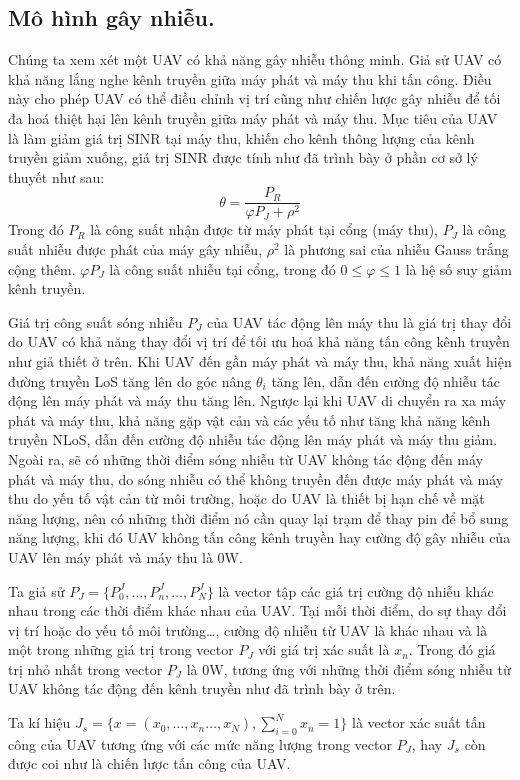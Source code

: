 \documentclass{uetgraduation}
\begin{document}
\subsection{Mô hình gây nhiễu.}
Chúng ta xem xét một UAV có khả năng gây nhiễu thông minh. Giả sử UAV có khả năng lắng nghe kênh truyền giữa máy phát và máy thu khi tấn công. Điều này cho phép UAV có thể điều chỉnh vị trí
cũng như chiến lược gây nhiễu để tối đa hoá thiệt hại lên kênh truyền giữa máy phát và máy thu. Mục tiêu của UAV là làm giảm giá trị SINR tại máy thu, khiến cho kênh thông lượng của kênh
truyền giảm xuống, giá trị SINR được tính như đã trình bày ở phần cơ sở lý thuyết như sau:
\[
\theta = \frac{P_R}{\varphi P_J + \rho^2}
\]
Trong đó $P_R$ là công suất nhận được từ máy phát tại cổng (máy thu), $P_J$ là công suất nhiễu được phát của máy gây nhiễu, $\rho^2$ là phương sai của nhiễu Gauss trắng cộng thêm. 
$\varphi P_J$ là công suất nhiễu tại cổng, trong đó $0 \leq \varphi \leq 1$ là hệ số suy giảm kênh truyền.

Giá trị công suất sóng nhiễu $P_J$ của UAV tác động lên máy thu là giá trị thay đổi do UAV có khả năng thay đổi vị trí để tối ưu hoá khả năng tấn công kênh truyền như giả thiết ở trên.
Khi UAV đến gần máy phát và máy thu, khả năng xuất hiện đường truyền LoS tăng lên do góc nâng $\theta_i$
tăng lên, dẫn đến cường độ nhiễu tác động lên máy phát và máy thu tăng lên. Ngược lại khi UAV di chuyển ra xa máy phát và máy thu, khả năng gặp vật cản và các yếu tố như tăng khả năng kênh
truyền NLoS, dẫn đến cường độ nhiễu tác động lên máy phát và máy thu giảm. Ngoài ra, sẽ có những thời điểm sóng nhiễu từ UAV không tác động đến máy phát và máy thu, do sóng nhiễu có thể không
truyền đến được máy phát và máy thu do yếu tố vật cản từ môi trường, hoặc do UAV là thiết bị hạn chế về mặt năng lượng, nên có những thời điểm nó cần quay lại trạm để thay pin để bổ sung năng
lượng, khi đó UAV không tấn công kênh truyền hay cường độ gây nhiễu của UAV lên máy phát và máy thu là 0W.

Ta giả sử $P_J = \{P_0^J, \dots, P_n^J, \dots, P_N^J\}$ là vector tập các giá trị cường độ nhiễu khác nhau trong các thời điểm khác nhau của UAV. Tại mỗi thời điểm, do sự thay đổi vị trí
hoặc do yếu tố môi trường\dots, cường độ nhiễu từ UAV là khác nhau và là một trong những giá trị trong vector $P_J$ với giá trị xác suất là $x_n$. Trong đó giá trị nhỏ nhất trong vector $P_J$
là 0W, tương ứng với những thời điểm sóng nhiễu từ UAV không tác động đến kênh truyền như đã trình bày ở trên.

Ta kí hiệu $J_s = \{x = (x_0, \dots, x_n\dots, x_N), \sum_{i=0}^{N}x_n = 1\}$ là vector xác suất tấn công của UAV tương ứng với các mức năng lượng trong vector $P_J$, hay $J_s$ còn được coi như
là chiến lược tấn công của UAV.
\end{document}
